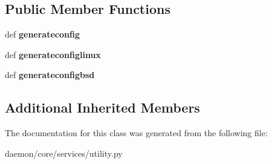 \subsection*{Public Member Functions}
\begin{DoxyCompactItemize}
\item 
\hypertarget{classcore_1_1services_1_1utility_1_1_i_p_forward_service_a3dcdbe5e230b02fb3e6b6a90d94b59ee}{def {\bfseries generateconfig}}\label{classcore_1_1services_1_1utility_1_1_i_p_forward_service_a3dcdbe5e230b02fb3e6b6a90d94b59ee}

\item 
\hypertarget{classcore_1_1services_1_1utility_1_1_i_p_forward_service_a7f5ba3c3f6a3d2e7b131317327cbbf16}{def {\bfseries generateconfiglinux}}\label{classcore_1_1services_1_1utility_1_1_i_p_forward_service_a7f5ba3c3f6a3d2e7b131317327cbbf16}

\item 
\hypertarget{classcore_1_1services_1_1utility_1_1_i_p_forward_service_a4b0cefd53625b4ac29437866c4bf487c}{def {\bfseries generateconfigbsd}}\label{classcore_1_1services_1_1utility_1_1_i_p_forward_service_a4b0cefd53625b4ac29437866c4bf487c}

\end{DoxyCompactItemize}
\subsection*{Additional Inherited Members}


The documentation for this class was generated from the following file\+:\begin{DoxyCompactItemize}
\item 
daemon/core/services/utility.\+py\end{DoxyCompactItemize}

